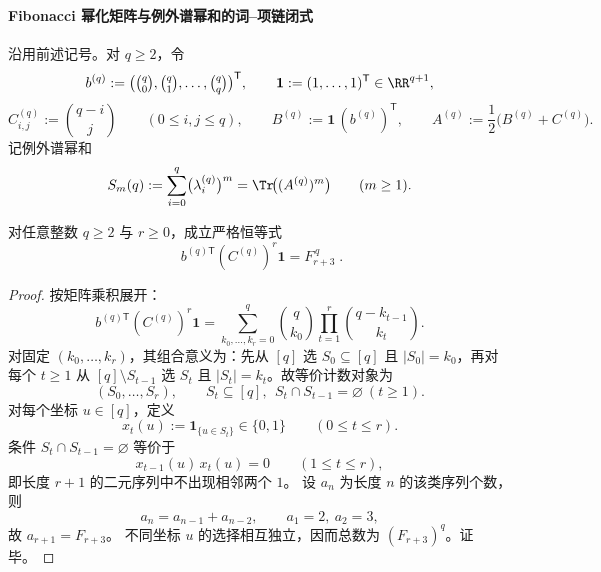 \paragraph{Fibonacci 幂化矩阵与例外谱幂和的词--项链闭式}
沿用前述记号。对 \(q\ge 2\)，令
\[
b^{(q)}:=\bigl(\tbinom q0,\tbinom q1,\dots,\tbinom qq\bigr)^{\mathsf T},
\qquad
\mathbf 1:=(1,\dots,1)^{\mathsf T}\in\RR^{q+1},
\]
\[
C^{(q)}_{i,j}:=\binom{q-i}{j}\qquad(0\le i,j\le q),
\qquad
B^{(q)}:=\mathbf 1\,(b^{(q)})^{\mathsf T},
\qquad
A^{(q)}:=\frac12\bigl(B^{(q)}+C^{(q)}\bigr).
\]
记例外谱幂和
\[
S_m(q):=\sum_{i=0}^{q}\bigl(\lambda_i^{(q)}\bigr)^m=\Tr\!\bigl((A^{(q)})^m\bigr)\qquad(m\ge 1).
\]

\begin{conclusion}\label{con:xi-replica-softcore-fibonacci-powered-matrix-coefficient-identity}
对任意整数 \(q\ge 2\) 与 \(r\ge 0\)，成立严格恒等式
\[
\boxed{\;
b^{(q)\mathsf T}(C^{(q)})^{r}\mathbf 1
=F_{r+3}^{\,q}\; }.
\]
\end{conclusion}
\begin{proof}
按矩阵乘积展开：
\[
b^{(q)\mathsf T}(C^{(q)})^r\mathbf 1
=\sum_{k_0,\dots,k_r=0}^{q}\binom{q}{k_0}\prod_{t=1}^{r}\binom{q-k_{t-1}}{k_t}.
\]
对固定 \((k_0,\dots,k_r)\)，其组合意义为：先从 \([q]\) 选 \(S_0\subseteq[q]\) 且 \(|S_0|=k_0\)，再对每个 \(t\ge 1\) 从 \([q]\setminus S_{t-1}\) 选 \(S_t\) 且 \(|S_t|=k_t\)。故等价计数对象为
\[
(S_0,\dots,S_r),\qquad
S_t\subseteq[q],\ \ S_t\cap S_{t-1}=\varnothing\ (t\ge 1).
\]
对每个坐标 \(u\in[q]\)，定义
\[
x_t(u):=\mathbf 1_{\{u\in S_t\}}\in\{0,1\}\qquad(0\le t\le r).
\]
条件 \(S_t\cap S_{t-1}=\varnothing\) 等价于
\[
x_{t-1}(u)\,x_t(u)=0\qquad(1\le t\le r),
\]
即长度 \(r+1\) 的二元序列中不出现相邻两个 \(1\)。
设 \(a_n\) 为长度 \(n\) 的该类序列个数，则
\[
a_n=a_{n-1}+a_{n-2},\qquad a_1=2,\ a_2=3,
\]
故 \(a_{r+1}=F_{r+3}\)。
不同坐标 \(u\) 的选择相互独立，因而总数为 \((F_{r+3})^q\)。证毕。
\end{proof}

